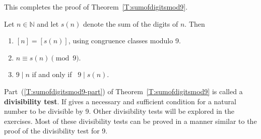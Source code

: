 This completes the proof of Theorem~\ref{T:sumofdigitsmod9}.
%
%
\begin{theorem} \label{T:sumofdigitsmod9}
Let  $n \in \mathbb{N}$ and let  $s( n )$ denote the sum of the digits of $n$.  Then
\begin{enumerate}
\item $[ n ] = [ {s( n )} ]$, using congruence classes modulo 9.

\item $n \equiv s( n ) \pmod 9$.

\item $9 \mid n$  if and only if \, $9 \mid s( n )$. \label{T:sumofdigitsmod9-part}
\end{enumerate}
\end{theorem}
Part~(\ref{T:sumofdigitsmod9-part}) of Theorem~\ref{T:sumofdigitsmod9} is called a \textbf{divisibility test}.
%
%
  If gives a necessary and sufficient condition for a natural number to be divisible by 9.  Other divisibility tests will be explored in the exercises.  Most of these divisibility tests can be proved in a manner similar to the proof of the divisibility test for 9.
%
\hbreak

\endinput
